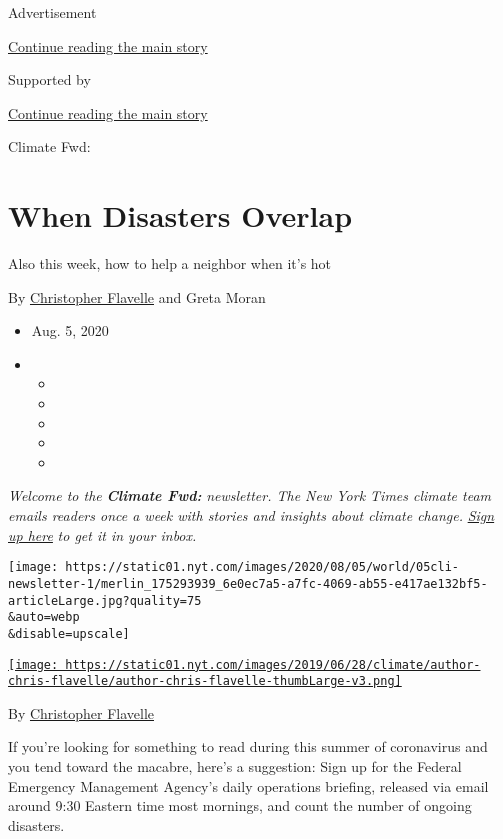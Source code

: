 Advertisement

\protect\hyperlink{after-top}{Continue reading the main story}

Supported by

\protect\hyperlink{after-sponsor}{Continue reading the main story}

Climate Fwd:

\hypertarget{when-disasters-overlap}{%
\section{When Disasters Overlap}\label{when-disasters-overlap}}

Also this week, how to help a neighbor when it's hot

By \href{https://www.nytimes.com/by/christopher-flavelle}{Christopher
Flavelle} and Greta Moran

\begin{itemize}
\item
  Aug. 5, 2020
\item
  \begin{itemize}
  \item
  \item
  \item
  \item
  \item
  \end{itemize}
\end{itemize}

\emph{Welcome to the} \emph{\textbf{Climate Fwd:}} \emph{newsletter. The
New York Times climate team emails readers once a week with stories and
insights about climate change.}
\href{https://www.nytimes.com/newsletters/climate-change}{\emph{Sign up
here}} \emph{to get it in your inbox.}

\texttt{[image: https://static01.nyt.com/images/2020/08/05/world/05cli-newsletter-1/merlin\_175293939\_6e0ec7a5-a7fc-4069-ab55-e417ae132bf5-articleLarge.jpg?quality=75\\\&auto=webp\\\&disable=upscale]}

\href{https://www.nytimes.com/by/christopher-flavelle}{\texttt{[image: https://static01.nyt.com/images/2019/06/28/climate/author-chris-flavelle/author-chris-flavelle-thumbLarge-v3.png]}}

By \href{https://www.nytimes.com/by/christopher-flavelle}{Christopher
Flavelle}

If you're looking for something to read during this summer of
coronavirus and you tend toward the macabre, here's a suggestion: Sign
up for the Federal Emergency Management Agency's daily operations
briefing, released via email around 9:30 Eastern time most mornings, and
count the number of ongoing disasters.

